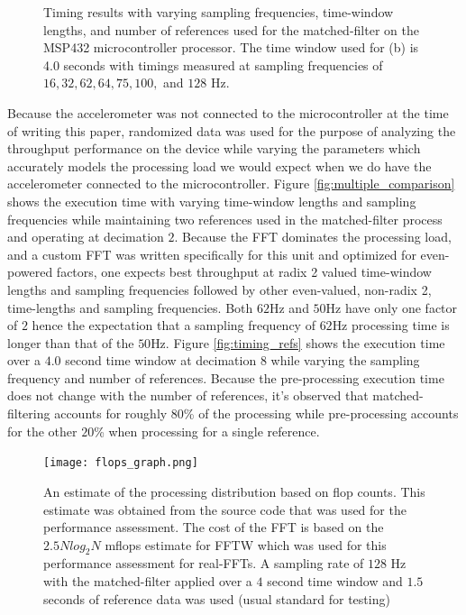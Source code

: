 \documentclass[journal]{IEEEtran}
\begin{document}
\begin{figure}[!ht]
   \centering
   \quad
   \caption{Timing results with varying sampling frequencies, time-window lengths, and number of references used for the matched-filter on the MSP432 microcontroller processor. The time window used for (b) is 4.0 seconds with timings measured at sampling frequencies of $16, 32, 62, 64, 75, 100,$ and $128$ Hz.}
   \label{fig:timing}
\end{figure}
%
Because the accelerometer was not connected to the microcontroller at the time of writing this paper, randomized data was used for the purpose of analyzing the throughput performance on the device while varying the parameters which accurately models the processing load we would expect when we do have the accelerometer connected to the microcontroller.
Figure \ref{fig:multiple_comparison} shows the execution time with varying time-window lengths and sampling frequencies while maintaining two references used in the matched-filter process and operating at decimation $2$.
Because the FFT dominates the processing load, and a custom FFT was written specifically for this unit and optimized for even-powered factors, one expects best throughput at radix 2 valued time-window lengths and sampling frequencies followed by other even-valued, non-radix 2, time-lengths and sampling frequencies. Both $62$Hz and $50$Hz have only one factor of $2$ hence the expectation that a sampling frequency of $62$Hz processing time is longer than that of the $50$Hz.
Figure \ref{fig:timing_refs} shows the execution time over a $4.0$ second time window at decimation $8$ while varying the sampling frequency and number of references. Because the pre-processing execution time does not change with the number of references, it's observed that matched-filtering accounts for roughly $80$\% of the processing while pre-processing accounts for the other $20$\% when processing for a single reference.
%
\begin{figure}[!ht]
   \centering
   \texttt{[image: flops\_graph.png]}
   \caption{An estimate of the processing distribution based on flop counts. This estimate was obtained from the source code that was used for the performance assessment. The cost of the FFT is based on the $2.5 N log_2 N$ mflops estimate for FFTW \cite{FFTW} which was used for this performance assessment for real-FFTs. A sampling rate of $128$ Hz with the matched-filter applied over a $4$ second time window and $1.5$ seconds of reference data was used (usual standard for testing)}
   \label{fig:flops_count}
\end{figure}
\end{document}
